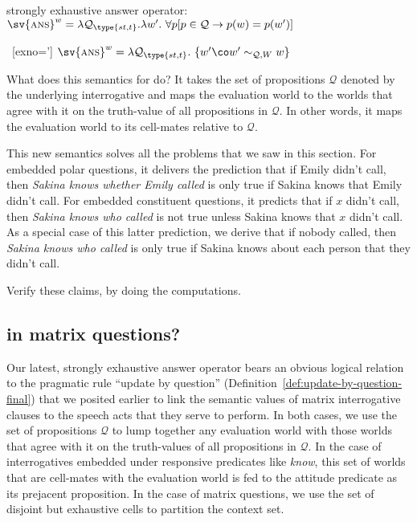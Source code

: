 \ex strongly exhaustive answer operator:\\
$\sv{\ans}^{w} = \lambda \mathcal{Q}_{\type{st,t}}.\lambda w'.\ \forall p [p\in\mathcal{Q} \rightarrow p(w)=p(w')]$
\xe

\ex~[exno=\lastx']%
%
$\sv{\ans}^{w} = \lambda \mathcal{Q}_{\type{st,t}}.\ \{w'\co w'\sim_{\mathcal{Q},W}w\}$
\xe

What does this semantics for \ans do? It takes the set of propositions
$\mathcal{Q}$ denoted by the underlying interrogative and maps the evaluation
world to the worlds that agree with it on the truth-value of all propositions in
$\mathcal{Q}$. In other words, it maps the evaluation world to its cell-mates
relative to $\mathcal{Q}$.

This new semantics solves all the problems that we saw in this section. For
embedded polar questions, it delivers the prediction that if Emily didn't call,
then \emph{Sakina knows whether Emily called} is only true if Sakina knows that
Emily didn't call. For embedded constituent questions, it predicts that if $x$
didn't call, then \emph{Sakina knows who called} is not true unless Sakina knows
that $x$ didn't call. As a special case of this latter prediction, we derive
that if nobody called, then \emph{Sakina knows who called} is only true if
Sakina knows about each person that they didn't call.

\begin{exercise}
  Verify these claims, by doing the computations.
\end{exercise}

\subsection{\ans in matrix questions?}
\label{sec:matrix-ans}

Our latest, strongly exhaustive answer operator bears an obvious logical
relation to the pragmatic rule ``update by question''
(Definition~\ref{def:update-by-question-final}) that we posited earlier to link
the semantic values of matrix interrogative clauses to the speech acts that they
serve to perform. In both cases, we use the set of propositions $\mathcal{Q}$ to
lump together any evaluation world with those worlds that agree with it on the
truth-values of all propositions in $\mathcal{Q}$. In the case of interrogatives
embedded under responsive predicates like \emph{know}, this set of worlds that
are cell-mates with the evaluation world is fed to the attitude predicate as its
prejacent proposition. In the case of matrix questions, we use the set of
disjoint but exhaustive cells to partition the context set.

